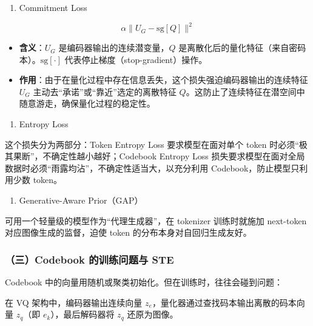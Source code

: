 \begin{enumerate}
\def\labelenumi{\arabic{enumi}.}
\tightlist
\item
  Commitment Loss
\end{enumerate}

\[
\alpha\lVert U_G-\mathrm{sg}[Q]\rVert^2
\]

\begin{itemize}
\tightlist
\item
  \textbf{含义}：\(U_G\) 是编码器输出的连续潜变量，\(Q\) 是离散化后的量化特征（来自密码本）。\(\mathrm{sg}[\cdot]\) 代表停止梯度（stop-gradient）操作。
\item
  \textbf{作用}：由于在量化过程中存在信息丢失，这个损失强迫编码器输出的连续特征 \(U_G\) 主动去``承诺''或``靠近''选定的离散特征 \(Q\)。这防止了连续特征在潜空间中随意游走，确保量化过程的稳定性。
\end{itemize}

\begin{enumerate}
\def\labelenumi{\arabic{enumi}.}
\setcounter{enumi}{1}
\tightlist
\item
  Entropy Loss
\end{enumerate}

这个损失分为两部分：Token Entropy Loss 要求模型在面对单个 token 时必须``极其果断''，不确定性越小越好；Codebook Entropy Loss 损失要求模型在面对全局数据时必须``雨露均沾''，不确定性适当大，以充分利用 Codebook，防止模型只利用少数 token。

\begin{enumerate}
\def\labelenumi{\arabic{enumi}.}
\setcounter{enumi}{2}
\tightlist
\item
  Generative-Aware Prior（GAP）
\end{enumerate}

可用一个轻量级的模型作为``代理生成器''，在 tokenizer 训练时就施加 next-token 对应图像生成的监督，迫使 token 的分布本身对自回归生成友好。

\hypertarget{ux4e09codebook-ux7684ux8badux7ec3ux95eeux9898ux4e0e-ste}{%
\subsubsection{（三）Codebook 的训练问题与 STE}\label{ux4e09codebook-ux7684ux8badux7ec3ux95eeux9898ux4e0e-ste}}

Codebook 中的向量用随机或聚类初始化。但在训练时，往往会碰到问题：

在 VQ 架构中，编码器输出连续向量 \(z_e\)，量化器通过查找码本输出离散的码本向量 \(z_q\)（即 \(e_k\)），最后解码器将 \(z_q\) 还原为图像。


